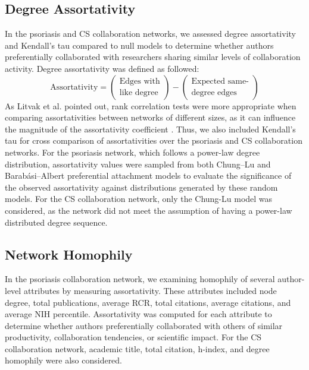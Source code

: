 \documentclass[9pt,twocolumn,twoside]{pnas-new}
\begin{document}
\subsection*{Degree Assortativity} 
In the psoriasis and CS collaboration networks, we assessed degree assortativity and Kendall's tau compared to null models to determine whether authors preferentially collaborated with researchers sharing similar levels of collaboration activity. Degree assortativity was defined as followed: 
\[
\text{Assortativity} = 
\left(
\begin{array}{c}
\text{Edges with} \\
\text{like degree}
\end{array}
\right)
-
\left(
\begin{array}{c}
\text{Expected same-} \\
\text{degree edges}
\end{array}
\right)
\]
\noindent As Litvak et al. pointed out, rank correlation tests were more appropriate when comparing assortativities between networks of different sizes, as it can influence the magnitude of the assortativity coefficient \cite{Litvak}.  Thus, we also included Kendall's tau for cross comparison of assortativities over the psoriasis and CS collaboration networks. For the psoriasis network, which follows a power-law degree distribution, assortativity values were sampled from both Chung–Lu and Barabási–Albert preferential attachment models to evaluate the significance of the observed assortativity against distributions generated by these random models. For the CS collaboration network, only the Chung-Lu model was considered, as the network did not meet the assumption of having a power-law distributed degree sequence.

\subsection*{Network Homophily} 
In the psoriasis collaboration network, we examining homophily of several author-level attributes by measuring assortativity. These attributes included node degree, total publications, average RCR, total citations, average citations, and average NIH percentile. Assortativity was computed for each attribute to determine whether authors preferentially collaborated with others of similar productivity, collaboration tendencies, or scientific impact. For the CS collaboration network, academic title, total citation, h-index, and degree homophily were also considered.
\end{document}
